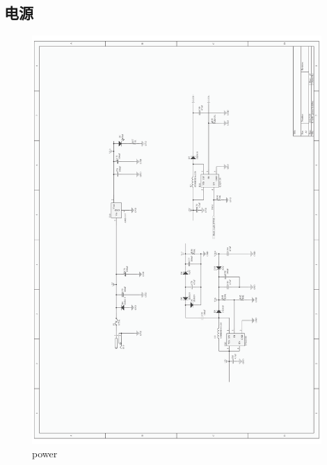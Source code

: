 \documentclass[titlepage]{article}
\begin{document}
 \subsection{电源}
 \begin{figure}[h]
  \centering
 \includegraphics[width=11cm]{power.pdf}
  \caption{power}
 \end{figure}

 \newpage
\end{document}
